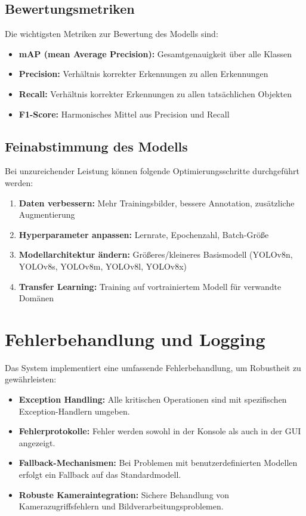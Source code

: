 \documentclass[12pt, a4paper]{scrreprt}
\begin{document}
\subsection{Bewertungsmetriken}
Die wichtigsten Metriken zur Bewertung des Modells sind:
\begin{itemize}
    \item \textbf{mAP (mean Average Precision):} Gesamtgenauigkeit über alle Klassen
    \item \textbf{Precision:} Verhältnis korrekter Erkennungen zu allen Erkennungen
    \item \textbf{Recall:} Verhältnis korrekter Erkennungen zu allen tatsächlichen Objekten
    \item \textbf{F1-Score:} Harmonisches Mittel aus Precision und Recall
\end{itemize}

\subsection{Feinabstimmung des Modells}
Bei unzureichender Leistung können folgende Optimierungsschritte durchgeführt werden:
\begin{enumerate}
    \item \textbf{Daten verbessern:} Mehr Trainingsbilder, bessere Annotation, zusätzliche Augmentierung
    \item \textbf{Hyperparameter anpassen:} Lernrate, Epochenzahl, Batch-Größe
    \item \textbf{Modellarchitektur ändern:} Größeres/kleineres Basismodell (YOLOv8n, YOLOv8s, YOLOv8m, YOLOv8l, YOLOv8x)
    \item \textbf{Transfer Learning:} Training auf vortrainiertem Modell für verwandte Domänen
\end{enumerate}

\section{Fehlerbehandlung und Logging}
Das System implementiert eine umfassende Fehlerbehandlung, um Robustheit zu gewährleisten:

\begin{itemize}
    \item \textbf{Exception Handling:} Alle kritischen Operationen sind mit spezifischen Exception-Handlern umgeben.
    \item \textbf{Fehlerprotokolle:} Fehler werden sowohl in der Konsole als auch in der GUI angezeigt.
    \item \textbf{Fallback-Mechanismen:} Bei Problemen mit benutzerdefinierten Modellen erfolgt ein Fallback auf das Standardmodell.
    \item \textbf{Robuste Kameraintegration:} Sichere Behandlung von Kamerazugriffsfehlern und Bildverarbeitungsproblemen.
\end{itemize}
\end{document}
